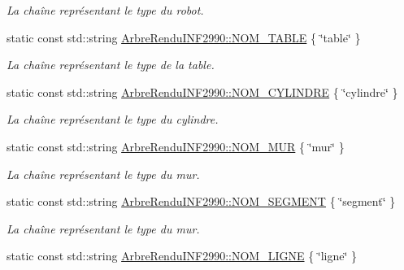 \begin{DoxyCompactItemize}
\begin{DoxyCompactList}\small\item\em La chaîne représentant le type du robot. \end{DoxyCompactList}\item 
\hypertarget{group__inf2990_ga89e651c1a28481ce70f473bd15555114}{static const std\-::string \hyperlink{group__inf2990_ga89e651c1a28481ce70f473bd15555114}{Arbre\-Rendu\-I\-N\-F2990\-::\-N\-O\-M\-\_\-\-T\-A\-B\-L\-E} \{ \char`\"{}table\char`\"{} \}}\label{group__inf2990_ga89e651c1a28481ce70f473bd15555114}

\begin{DoxyCompactList}\small\item\em La chaîne représentant le type de la table. \end{DoxyCompactList}\item 
\hypertarget{group__inf2990_gae74e1de66e37dee6ef6cb6df82424c0d}{static const std\-::string \hyperlink{group__inf2990_gae74e1de66e37dee6ef6cb6df82424c0d}{Arbre\-Rendu\-I\-N\-F2990\-::\-N\-O\-M\-\_\-\-C\-Y\-L\-I\-N\-D\-R\-E} \{ \char`\"{}cylindre\char`\"{} \}}\label{group__inf2990_gae74e1de66e37dee6ef6cb6df82424c0d}

\begin{DoxyCompactList}\small\item\em La chaîne représentant le type du cylindre. \end{DoxyCompactList}\item 
\hypertarget{group__inf2990_ga4d9c8c9bfa165dde522834dec2882039}{static const std\-::string \hyperlink{group__inf2990_ga4d9c8c9bfa165dde522834dec2882039}{Arbre\-Rendu\-I\-N\-F2990\-::\-N\-O\-M\-\_\-\-M\-U\-R} \{ \char`\"{}mur\char`\"{} \}}\label{group__inf2990_ga4d9c8c9bfa165dde522834dec2882039}

\begin{DoxyCompactList}\small\item\em La chaîne représentant le type du mur. \end{DoxyCompactList}\item 
\hypertarget{group__inf2990_gaffe953e9369343040aa5d1b72510d810}{static const std\-::string \hyperlink{group__inf2990_gaffe953e9369343040aa5d1b72510d810}{Arbre\-Rendu\-I\-N\-F2990\-::\-N\-O\-M\-\_\-\-S\-E\-G\-M\-E\-N\-T} \{ \char`\"{}segment\char`\"{} \}}\label{group__inf2990_gaffe953e9369343040aa5d1b72510d810}

\begin{DoxyCompactList}\small\item\em La chaîne représentant le type du mur. \end{DoxyCompactList}\item 
\hypertarget{group__inf2990_ga776d72e2b41b06f1992ba48b1ed3de0b}{static const std\-::string \hyperlink{group__inf2990_ga776d72e2b41b06f1992ba48b1ed3de0b}{Arbre\-Rendu\-I\-N\-F2990\-::\-N\-O\-M\-\_\-\-L\-I\-G\-N\-E} \{ \char`\"{}ligne\char`\"{} \}}\label{group__inf2990_ga776d72e2b41b06f1992ba48b1ed3de0b}


\end{DoxyCompactItemize}
